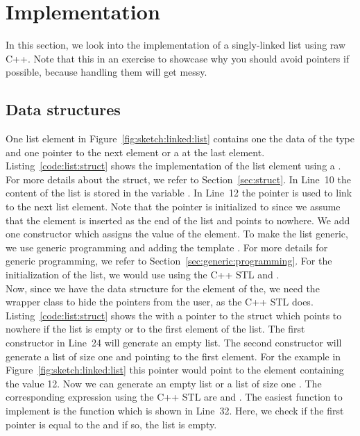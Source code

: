 \documentclass[11pt,fleqn]{book} %
\begin{document}
\chapter{Implementation}
In this section, we look into the implementation of a singly-linked list using raw C++. Note that this in an exercise to showcase why you should avoid pointers if possible, because handling them will get messy. 

\section*{Data structures}
One list element in Figure~\ref{fig:sketch:linked:list} contains one the data of the type  and one pointer to the next element or a  at the last element. Listing~\ref{code:list:struct} shows the implementation of the list element using a . For more details about the struct, we refer to Section~\ref{sec:struct}. In Line~10 the content of the list is stored in the variable . In Line~12 the pointer  is used to link to the next list element. Note that the pointer is initialized to  since we assume that the element is inserted as the end of the list and points to nowhere. We add one constructor which assigns the value of the element. To make the list generic, we use generic programming and adding the template . For more details for generic programming, we refer to Section~\ref{sec:generic:programming}. For the initialization of the list, we would use  using the C++ STL and .\\

Now, since we have the data structure for the element of the, we need the wrapper class to hide the pointers from the user, as the C++ STL does. Listing~\ref{code:list:struct} shows the  with a pointer to the struct  which points to nowhere  if the list is empty or to the first element of the list. The first constructor in Line~24 will generate an empty list. The second constructor will generate a list of size one and pointing to the first element. For the example in Figure~\ref{fig:sketch:linked:list} this pointer would point to the element containing the value 12. Now we can generate an empty list  or a list of size one . The corresponding expression using the C++ STL are  and . The easiest function to implement is the  function which is shown in Line~32. Here, we check if the first pointer is equal to the  and if so, the list is empty. 
\end{document}
